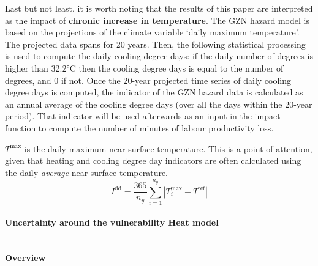 \documentclass[a4paper,11pt]{extarticle} %
\theoremstyle{definition}
\begin{document}
Last but not least, it is worth noting that the results of this paper are interpreted as the impact of \textbf{chronic increase in temperature}.
The GZN hazard  model is based on the projections of the climate variable `daily maximum temperature'. The projected data spans for 20 years. Then, the following statistical processing is used to compute the daily cooling degree days: if the daily number of degrees is higher than $32.2$°C then the cooling degree days is equal to the number of degrees, and 0 if not. Once the 20-year projected time series of daily cooling degree days is computed, the indicator of the GZN hazard data is calculated as an annual average of the cooling degree days (over all the days within the 20-year period). That indicator will be used afterwards as an input in the impact function to compute the number of minutes of labour productivity loss. %

$T^\text{max}$ is the daily maximum near-surface temperature. This is a point of attention, given that heating and cooling degree day indicators are often calculated using the daily \emph{average} near-surface temperature.
\begin{equation}
    \label{Eq:degree_days}
    I^\text{dd} = \frac{365}{n_y} \sum_{i = 1}^{n_y} |  T^\text{max}_i - T^\text{ref} |
\end{equation}

\paragraph{Uncertainty around the vulnerability Heat model\\}
\textbf{\\Overview}
\end{document}
